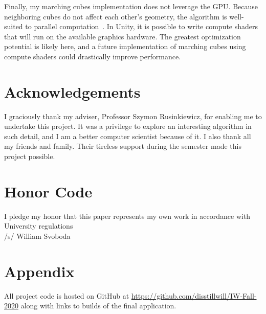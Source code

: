 \documentclass[pageno]{jpaper}
\begin{document}
Finally, my marching cubes implementation does not leverage the GPU. Because neighboring cubes do not affect each other's geometry, the algorithm is well-suited to parallel computation~\cite{kieran}. In Unity, it is possible to write compute shaders that will run on the available graphics hardware. The greatest optimization potential is likely here, and a future implementation of marching cubes using compute shaders could drastically improve performance. 

\section*{Acknowledgements}

I graciously thank my adviser, Professor Szymon Rusinkiewicz, for enabling me to undertake this project. It was a privilege to explore an interesting algorithm in such detail, and I am a better computer scientist because of it. I also thank all my friends and family. Their tireless support during the semester made this project possible.

\section*{Honor Code}

I pledge my honor that this paper represents my own work in accordance with University regulations \\/s/ William Svoboda

\pagebreak




\appendix

\section{Appendix}

All project code is hosted on GitHub at \url{https://github.com/disstillwill/IW-Fall-2020} along with links to builds of the final application.
\end{document}
